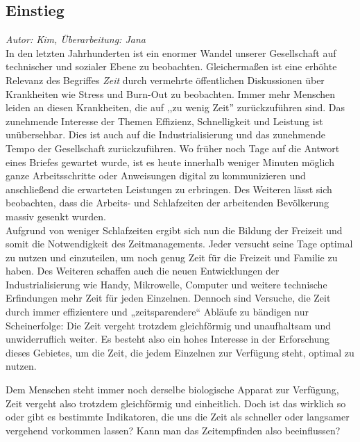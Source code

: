 \documentclass{Paper}
\begin{document}
\subsection{Einstieg}
\textit{Autor: Kim, Überarbeitung: Jana}\\
In den letzten Jahrhunderten ist ein enormer Wandel unserer Gesellschaft auf technischer und sozialer Ebene zu beobachten. Gleichermaßen ist eine erhöhte Relevanz des Begriffes \textit{Zeit} durch vermehrte öffentlichen Diskussionen über Krankheiten wie Stress und Burn-Out zu beobachten. Immer mehr Menschen leiden an diesen Krankheiten, die auf ,,zu wenig Zeit'' zurückzuführen sind. Das zunehmende Interesse der Themen Effizienz, Schnelligkeit und Leistung ist unübersehbar. 
Dies ist auch auf die Industrialisierung und das zunehmende Tempo der Gesellschaft zurückzuführen. \cite{Wallisch2003} Wo früher noch Tage auf die Antwort eines Briefes gewartet wurde, ist es heute innerhalb weniger Minuten möglich ganze Arbeitsschritte oder Anweisungen digital zu kommunizieren und anschließend die erwarteten Leistungen zu erbringen.
Des Weiteren lässt sich beobachten, dass die Arbeits- und Schlafzeiten der arbeitenden Bevölkerung massiv gesenkt wurden. \cite{DeutscheSozialgeschichte}
\\
Aufgrund von weniger Schlafzeiten ergibt sich nun die Bildung der Freizeit und somit die Notwendigkeit des Zeitmanagements. Jeder versucht seine Tage optimal zu nutzen und einzuteilen, um noch genug Zeit für die Freizeit und Familie zu haben. Des Weiteren schaffen auch die neuen Entwicklungen der Industrialisierung wie Handy, Mikrowelle, Computer und weitere technische Erfindungen mehr Zeit für jeden Einzelnen. Dennoch sind Versuche, die Zeit durch immer effizientere und „zeitsparendere“ Abläufe zu bändigen nur Scheinerfolge: Die Zeit vergeht trotzdem gleichförmig und unaufhaltsam und unwiderruflich weiter. \cite{Wallisch2003} Es besteht also ein hohes Interesse in der Erforschung dieses Gebietes, um die Zeit, die jedem Einzelnen zur Verfügung steht, optimal zu nutzen.

Dem Menschen steht immer noch derselbe biologische Apparat zur Verfügung, Zeit vergeht also trotzdem gleichförmig und einheitlich. Doch ist das wirklich so oder gibt es bestimmte Indikatoren, die uns die Zeit als schneller oder langsamer vergehend vorkommen lassen? Kann man das Zeitempfinden also beeinflussen?
\end{document}
